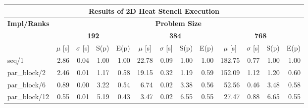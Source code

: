 \begin{tabular}{|lllllllllllll|}
\hline
\multicolumn{13}{|c|}{\textbf{Results of 2D Heat Stencil Execution}} \\ \hline
\multicolumn{1}{|c|}{\textbf{Impl/Ranks}} & \multicolumn{12}{c|}{\textbf{Problem Size}} \\ \hline
\multicolumn{1}{|c|}{\textbf{}} & \multicolumn{4}{c|}{\textbf{192}} & \multicolumn{4}{c|}{\textbf{384}} & \multicolumn{4}{c|}{\textbf{768}} \\ \hline
\multicolumn{1}{|l|}{} & \multicolumn{1}{c|}{$\mu$ [s]} & \multicolumn{1}{c|}{$\sigma$ [s]} & \multicolumn{1}{c|}{S(p)} & \multicolumn{1}{c|}{E(p)} & \multicolumn{1}{c|}{$\mu$ [s]} & \multicolumn{1}{c|}{$\sigma$ [s]} & \multicolumn{1}{c|}{S(p)} & \multicolumn{1}{c|}{E(p)} & \multicolumn{1}{c|}{$\mu$ [s]} & \multicolumn{1}{c|}{$\sigma$ [s]} & \multicolumn{1}{c|}{S(p)} & \multicolumn{1}{c|}{E(p)} \\ \hline
\multicolumn{1}{|l|}{seq/1}  & \multicolumn{1}{r|}{2.86} & \multicolumn{1}{r|}{0.04} & \multicolumn{1}{r|}{1.00} & \multicolumn{1}{r|}{1.00}  & \multicolumn{1}{r|}{22.78} & \multicolumn{1}{r|}{0.09} & \multicolumn{1}{r|}{1.00} & \multicolumn{1}{r|}{1.00}  & \multicolumn{1}{r|}{182.75} & \multicolumn{1}{r|}{0.77} & \multicolumn{1}{r|}{1.00} & \multicolumn{1}{r|}{1.00}  \\ \hline
\multicolumn{1}{|l|}{par\_block/2}  & \multicolumn{1}{r|}{2.46} & \multicolumn{1}{r|}{0.01} & \multicolumn{1}{r|}{1.17} & \multicolumn{1}{r|}{0.58}  & \multicolumn{1}{r|}{19.15} & \multicolumn{1}{r|}{0.32} & \multicolumn{1}{r|}{1.19} & \multicolumn{1}{r|}{0.59}  & \multicolumn{1}{r|}{152.09} & \multicolumn{1}{r|}{1.12} & \multicolumn{1}{r|}{1.20} & \multicolumn{1}{r|}{0.60}  \\ \hline
\multicolumn{1}{|l|}{par\_block/6}  & \multicolumn{1}{r|}{0.89} & \multicolumn{1}{r|}{0.00} & \multicolumn{1}{r|}{3.22} & \multicolumn{1}{r|}{0.54}  & \multicolumn{1}{r|}{6.74} & \multicolumn{1}{r|}{0.02} & \multicolumn{1}{r|}{3.38} & \multicolumn{1}{r|}{0.56}  & \multicolumn{1}{r|}{52.56} & \multicolumn{1}{r|}{0.46} & \multicolumn{1}{r|}{3.48} & \multicolumn{1}{r|}{0.58}  \\ \hline
\multicolumn{1}{|l|}{par\_block/12}  & \multicolumn{1}{r|}{0.55} & \multicolumn{1}{r|}{0.01} & \multicolumn{1}{r|}{5.19} & \multicolumn{1}{r|}{0.43}  & \multicolumn{1}{r|}{3.47} & \multicolumn{1}{r|}{0.02} & \multicolumn{1}{r|}{6.55} & \multicolumn{1}{r|}{0.55}  & \multicolumn{1}{r|}{27.47} & \multicolumn{1}{r|}{0.88} & \multicolumn{1}{r|}{6.65} & \multicolumn{1}{r|}{0.55}  \\ \hline

\end{tabular}
